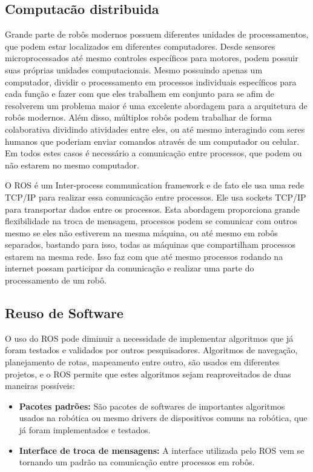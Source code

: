 \subsection{Computacão distribuida}
Grande parte de robôs modernos possuem diferentes unidades de processamentos, que podem estar localizados em diferentes computadores. Desde sensores microprocessados até mesmo controles específicos para motores, podem possuir suas próprias unidades computacionais. Mesmo possuindo apenas um computador, dividir o processamento em processos individuais específicos para cada função e fazer com que eles trabalhem em conjunto para se afim de resolverem um problema maior é uma excelente abordagem para a arquitetura de robôs modernos. Além disso, múltiplos robôs podem trabalhar de forma colaborativa dividindo atividades entre eles, ou até mesmo interagindo com seres humanos que poderiam enviar comandos através de um computador ou celular. Em todos estes casos é necessário a comunicação entre processos, que podem ou não estarem no mesmo computador. 

O ROS é um Inter-process communication framework e de fato ele usa uma rede TCP/IP para realizar essa comunicação entre processos. Ele usa sockets TCP/IP para transportar dados entre os processos. Esta abordagem proporciona grande flexibilidade na troca de mensagem, processos podem se comunicar com outros mesmo se eles não estiverem na mesma máquina, ou até mesmo em robôs separados, bastando para isso, todas as máquinas que compartilham processos estarem na mesma rede. Isso faz com que até mesmo processos rodando na internet possam participar da comunicação e realizar uma parte do processamento de um robô.


\subsection{Reuso de Software}
O uso do ROS pode diminuir a necessidade de implementar algoritmos que já foram testados e validados por outros pesquisadores. Algoritmos de navegação, planejamento de rotas, mapeamento entre outro, são usados em diferentes projetos, e o ROS permite que estes algoritmos sejam reaproveitados de duas maneiras possíveis:

\begin{itemize}
    \item \textbf{Pacotes padrões:} São pacotes de softwares de importantes algoritmos usados na robótica ou mesmo drivers de dispositivos comuns na robótica, que já foram implementados e testados.

    \item \textbf{Interface de troca de mensagens:} A interface utilizada pelo ROS vem se tornando um padrão na comunicação entre processos em robôs.
\end{itemize}


